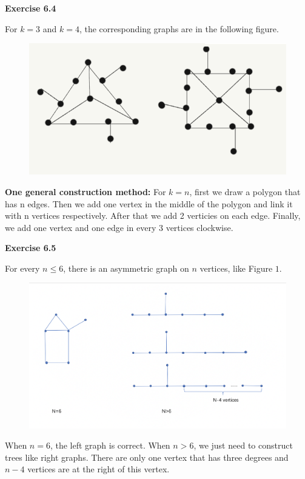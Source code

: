 \documentclass{article} %
\begin{document}
	\textbf{Exercise 6.4}\par
	For $k=3$ and $k=4$, the corresponding graphs are in the following figure.
	\begin{figure}[H]
		\centering
		\includegraphics[scale=0.8]{p2.png}
		\caption{}
		\label{fig:5}
	\end{figure}
	\textbf{One general construction method:} For $k=n$, first we draw a polygon that has n edges. Then we add one vertex in the middle of the polygon and link it with n vertices respectively. After that we add 2 verticies on each edge. Finally, we add one vertex and one edge in every 3 vertices clockwise. 

	\textbf{Exercise 6.5}\par
	For every $n\le6$, there is an asymmetric graph on $n$ vertices, like Figure $1$.
  	\begin{figure}[H]
  	\centering
  	\includegraphics[scale=0.4]{65.png}
  	\caption{}
  	\label{fig:6}
  	\end{figure}
	When $n=6$, the left graph is correct. When $n>6$, we just need to construct trees like right graphs. 
	There are only one vertex that has three degrees and  $n-4$ vertices are at the right of this vertex.
	 
\end{document}

